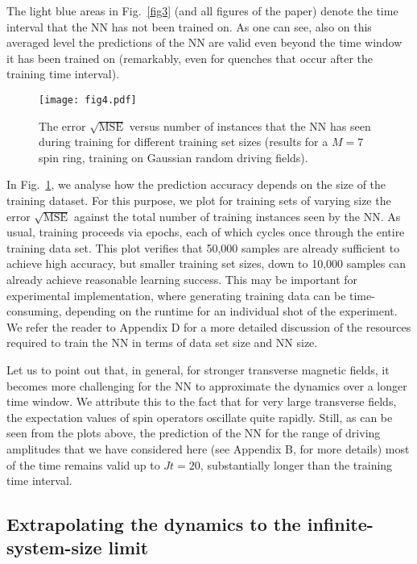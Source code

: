 \documentclass[a4paper,aps,amsmath,amssymb,twocolumn,longbibliography,,accepted=2022-05-17]{quantumarticle}
\begin{document}
The light blue areas in Fig.~\ref{fig3} (and all figures of the paper) denote the time interval that the NN has not been trained on.   As one can see, also on this averaged level the predictions of the NN are valid even beyond the time window it has been trained on (remarkably, even for quenches that occur after the training time interval).

\begin{figure}[]
	\centering
	\texttt{[image: fig4.pdf]}
	\caption{
		The error $\sqrt{\textrm{MSE}}$ versus number of instances that the NN has seen during training for different training set sizes (results for a $M=7$ spin ring,  training on Gaussian random driving fields).
	}
	\label{fig3_2}
\end{figure}


In Fig.~\ref{fig3_2}, we analyse how the prediction accuracy depends on the size of the training dataset. For this purpose, we plot for training sets of varying size the error $\sqrt{\textrm{MSE}}$ against the total number of training instances seen by the NN. As usual, training proceeds via epochs, each of which cycles once through the entire training data set. This plot verifies that 50,000 samples are already sufficient to achieve high accuracy, but smaller training set sizes, down to 10,000 samples can already achieve reasonable learning success. This may be important for experimental implementation, where generating training data can be time-consuming, depending on the runtime for an individual shot of the experiment. We refer the reader to  Appendix D for a more detailed discussion of the resources required to train the NN in terms of data set size and NN size.



Let us to point out that, in general, for stronger transverse magnetic fields, it becomes more challenging for the NN to approximate the dynamics over a longer time window. We attribute this to the fact that for very large transverse fields, the expectation values of spin operators oscillate quite rapidly. %
Still, as can be seen from the plots above, the prediction of the NN for the range of driving amplitudes that we have considered here (see Appendix B, for more details) most of the time remains valid up to $Jt =20$, substantially longer than the training time interval.


\subsection{Extrapolating the dynamics to the infinite-system-size limit}
\end{document}

